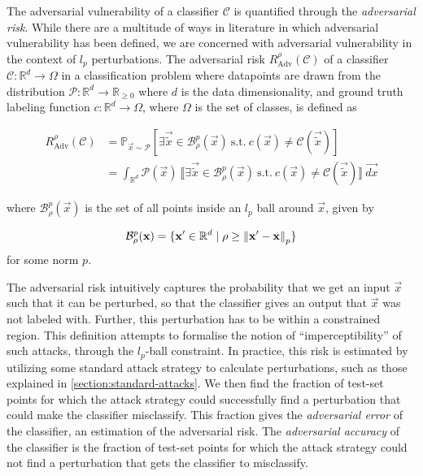 \documentclass{ociamthesis}
\begin{document}
The adversarial vulnerability of a classifier $\mathcal{C}$ is quantified
through the \emph{adversarial risk}. While there are a multitude of ways in
literature in which adversarial vulnerability has been defined, we are concerned
with adversarial vulnerability in the context of $l_p$ perturbations. The
adversarial risk $R_{\text{Adv}}^{\rho}(\mathcal{C}) $ of a classifier
$\mathcal{C}: \mathbb{R}^d \to \Omega$ in a classification problem where
datapoints are drawn from the distribution $\mathcal{P}: \mathbb{R}^d \to
\mathbb{R}_{\geq 0}$ where $d$ is the data dimensionality, and ground truth
labeling function $c: \mathbb{R}^d \to \Omega$, where $\Omega$ is the set of
classes, is defined as

\begin{equation} \label{eq:adv-risk}
    \begin{split}
    R_{\text{Adv}}^{\rho}(\mathcal{C}) & = \mathbb{P}_{\vec{x} \sim \mathcal{P}}
    [\exists \vec{\tilde{x}} \in \mathcal{B}_\rho^p(\vec{x})~\text{s.t.}~c(\vec{x}) \neq \mathcal{C}(\vec{\tilde{x}})] \\
    & = \int_{\mathbb{R}^d} \mathcal{P}(\vec{x})
    ~\llbracket \exists \vec{\tilde{x}} \in \mathcal{B}_\rho^p(\vec{x})~\text{s.t.}~c(\vec{x}) \neq \mathcal{C}(\vec{\tilde{x}}) \rrbracket~\vec{dx}
    \end{split}
\end{equation}

where $\mathcal{B}_\rho^p(\vec{x})$ is the set of all points inside an $l_p$
ball around $\vec{x}$, given by 

\begin{equation*}
    \mathcal{B}_\rho^p({\mathbf{x}}) = \{{\mathbf{x'}} \in
    \mathbb{R}^d \mid \rho \geq \mathrm{\left\lVert{\mathbf{x'}} - {\mathbf{x}}\right\rVert}_p\}
\end{equation*}
for some norm $p$.

The adversarial risk intuitively captures the probability that we get an input
$\vec{x}$ such that it can be perturbed, so that the classifier gives an output
that $\vec{x}$ was not labeled with. Further, this perturbation has to be within
a constrained region. This definition attempts to formalise the notion of
``imperceptibility'' of such attacks, through the $l_p$-ball constraint. In
practice, this risk is estimated by utilizing some standard attack strategy to
calculate perturbations, such as those explained in
\cref{section:standard-attacks}. We then find the fraction of test-set points
for which the attack strategy could successfully find a perturbation that could
make the classifier misclassify. This fraction gives the \emph{adversarial
error} of the classifier, an estimation of the adversarial risk. The
\emph{adversarial accuracy} of the classifier is the fraction of test-set points
for which the attack strategy could not find a perturbation that gets the
classifier to misclassify.
\end{document}
